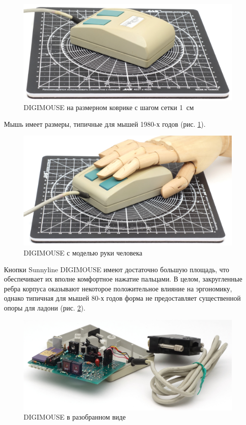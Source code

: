 \documentclass[11pt, a4paper]{article}
\begin{document}
\begin{figure}[h]
    \centering
    \includegraphics[scale=0.55]{1986_sunnyline_digimouse/size_30.jpg}
    \caption{DIGIMOUSE на размерном коврике с шагом сетки 1~см}
    \label{fig:SunnylineDIGIMOUSESize}
\end{figure}

Мышь имеет размеры, типичные для мышей 1980-х годов (рис. \ref{fig:SunnylineDIGIMOUSESize}).

\begin{figure}[h]
    \centering
    \includegraphics[scale=0.55]{1986_sunnyline_digimouse/hand_30.jpg}
    \caption{DIGIMOUSE с моделью руки человека}
    \label{fig:SunnylineDIGIMOUSEHand}
\end{figure}

Кнопки Sunnyline DIGIMOUSE имеют достаточно большую площадь, что обеспечивает их вполне комфортное нажатие пальцами. В целом, закругленные ребра корпуса оказывают некоторое положительное влияние на эргономику, однако типичная для мышей 80-х годов форма не предоставляет существенной опоры для ладони (рис. \ref{fig:SunnylineDIGIMOUSEHand}).

\begin{figure}[h]
    \centering
    \includegraphics[scale=0.65]{1986_sunnyline_digimouse/inside_30.jpg}
    \caption{DIGIMOUSE в разобранном виде}
    \label{fig:SunnylineDIGIMOUSEInside}
\end{figure}
\end{document}
